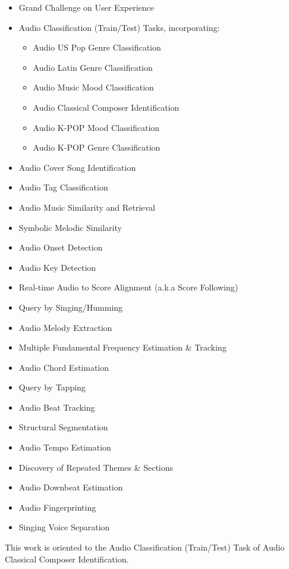 \documentclass[a4paper,openany,oneside,12pt]{book}
\begin{document}
\begin{itemize}
    \item Grand Challenge on User Experience
    \item Audio Classification (Train/Test) Tasks, incorporating:
    \begin{itemize}
        \item Audio US Pop Genre Classification
        \item Audio Latin Genre Classification
        \item Audio Music Mood Classification
        \item Audio Classical Composer Identification
        \item Audio K-POP Mood Classification
        \item Audio K-POP Genre Classification 
    \end{itemize}
    \item Audio Cover Song Identification
    \item Audio Tag Classification
    \item Audio Music Similarity and Retrieval
    \item Symbolic Melodic Similarity
    \item Audio Onset Detection
    \item Audio Key Detection
    \item Real-time Audio to Score Alignment (a.k.a Score Following)
    \item Query by Singing/Humming
    \item Audio Melody Extraction
    \item Multiple Fundamental Frequency Estimation \& Tracking
    \item Audio Chord Estimation
    \item Query by Tapping
    \item Audio Beat Tracking
    \item Structural Segmentation
    \item Audio Tempo Estimation
    \item Discovery of Repeated Themes \& Sections
    \item Audio Downbeat Estimation
    \item Audio Fingerprinting
    \item Singing Voice Separation 
\end{itemize}

This work is oriented to the Audio Classification (Train/Test) Task of Audio Classical Composer Identification.
\end{document}

